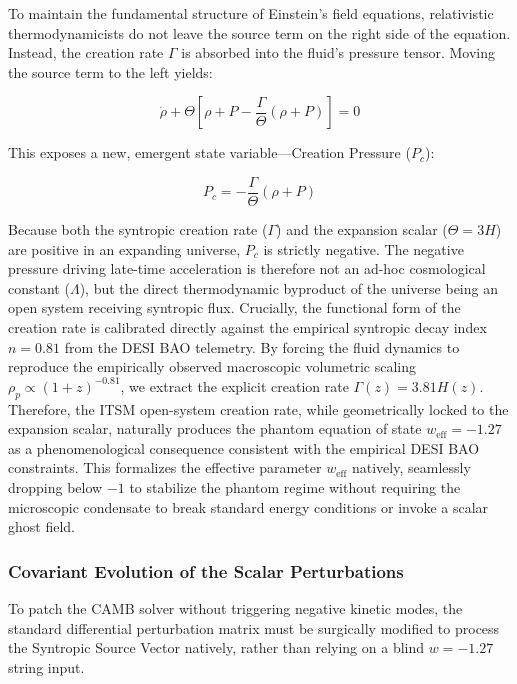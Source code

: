\documentclass[aps,prd,10pt,twocolumn,superscriptaddress,nofootinbib,floatfix]{revtex4-2}
\begin{document}
To maintain the fundamental structure of Einstein's field equations, relativistic thermodynamicists do not leave the source term on the right side of the equation. Instead, the creation rate $\Gamma$ is absorbed into the fluid's pressure tensor. Moving the source term to the left yields:

\begin{equation}
\dot{\rho} + \Theta \left[ \rho + P - \frac{\Gamma}{\Theta}(\rho + P) \right] = 0
\end{equation}

This exposes a new, emergent state variable---Creation Pressure ($P_c$):

\begin{equation}
P_c = -\frac{\Gamma}{\Theta}(\rho + P)
\end{equation}

Because both the syntropic creation rate ($\Gamma$) and the expansion scalar ($\Theta = 3H$) are positive in an expanding universe, $P_c$ is strictly negative. The negative pressure driving late-time acceleration is therefore not an ad-hoc cosmological constant ($\Lambda$), but the direct thermodynamic byproduct of the universe being an open system receiving syntropic flux. Crucially, the functional form of the creation rate is calibrated directly against the empirical syntropic decay index $n = 0.81$ from the DESI BAO telemetry. By forcing the fluid dynamics to reproduce the empirically observed macroscopic volumetric scaling $\rho_p \propto (1+z)^{-0.81}$, we extract the explicit creation rate $\Gamma(z) = 3.81 H(z)$. Therefore, the ITSM open-system creation rate, while geometrically locked to the expansion scalar, naturally produces the phantom equation of state $w_{\text{eff}} = -1.27$ as a phenomenological consequence consistent with the empirical DESI BAO constraints. This formalizes the effective parameter $w_{\text{eff}}$ natively, seamlessly dropping below $-1$ to stabilize the phantom regime without requiring the microscopic condensate to break standard energy conditions or invoke a scalar ghost field.

\subsubsection{Covariant Evolution of the Scalar Perturbations}

To patch the CAMB solver without triggering negative kinetic modes, the standard differential perturbation matrix must be surgically modified to process the Syntropic Source Vector natively, rather than relying on a blind $w = -1.27$ string input.
\end{document}
